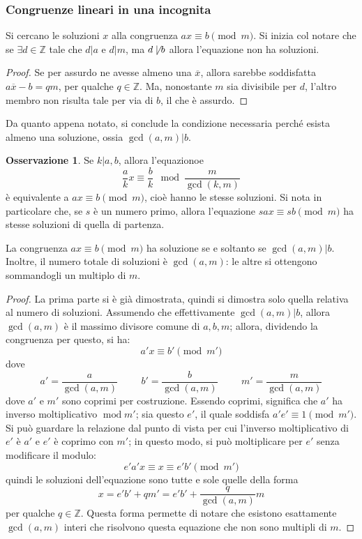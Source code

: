 \documentclass[11pt, a4paper]{scrartcl}
\theoremstyle{definition}
\numberwithin{esempio}{section}
\theoremstyle{definition}
\newtheorem{obs}{Osservazione}
\numberwithin{obs}{section}
\numberwithin{nota}{section}
\numberwithin{equation}{subsection}
\begin{document}
\subsubsection{Congruenze lineari in una incognita}
Si cercano le soluzioni $x$ alla congruenza $ax \equiv b \pmod{m} $. 
Si inizia col notare che se $\exists d \in \mathbb{Z}$ tale che $d | a$ e $d | m$, ma $d \not  \mid  b$ allora l'equazione non ha soluzioni.
\begin{proof}
	Se per assurdo ne avesse almeno una $\overline{x}$, allora sarebbe soddisfatta $a \overline{x} - b = q m $, per qualche $q \in \mathbb{Z}$. 
	Ma, nonostante $m$ sia divisibile per $d$, l'altro membro non risulta tale per via di $b$, il che \`e assurdo. 
\end{proof}
Da quanto appena notato, si conclude la condizione necessaria perch\'e esista almeno una soluzione, ossia $\operatorname{gcd}(a,m) | b$.
\begin{obs}
	Se $k | a,b$, allora l'equazionoe 
	\[
	\frac{a}{k} x \equiv \frac{b}{k} \mod \frac{m}{\operatorname{gcd}(k,m) }
	\] 
	\`e equivalente a $a x \equiv b \pmod{m} $, cio\`e hanno le stesse soluzioni. 
	Si nota in particolare che, se $s$ \`e un numero primo, allora l'equazione $sax \equiv sb \pmod{m} $ ha stesse soluzioni di quella di partenza.
\end{obs}
\begin{teorema}
	{}{}
	La congruenza $ax \equiv b \pmod{m} $ ha soluzione se e soltanto se $\operatorname{gcd}(a,m) | b$. 
	Inoltre, il numero totale di soluzioni \`e $\operatorname{gcd}(a,m) $: le altre si ottengono sommandogli un multiplo di $m$.
	\begin{proof}
		La prima parte si \`e gi\`a dimostrata, quindi si dimostra solo quella relativa al numero di soluzioni.
		Assumendo che effettivamente $\operatorname{gcd}(a,m) | b$, allora $\operatorname{gcd}(a,m) $ \`e il massimo divisore comune di $a,b,m$; allora, dividendo la congruenza per questo, si ha:
		\[
		a' x \equiv b ' \pmod{m'} 
		\] 
		dove 
		\[
		a' = \frac{a}{\operatorname{gcd}(a,m) }\hspace{1cm} b' = \frac{b}{\operatorname{gcd}(a,m) } \hspace{1cm} m' = \frac{m}{\operatorname{gcd}(a,m) }
		\] 
		dove $a'$ e $m'$ sono coprimi per costruzione. 
		Essendo coprimi, significa che $a'$ ha inverso moltiplicativo $\operatorname{mod}m' $; sia questo $e'$, il quale soddisfa $a' e '\equiv 1 \pmod{m'} $. 
		Si pu\`o guardare la relazione dal punto di vista per cui l'inverso moltiplicativo di $e'$ \`e $a'$ e $e' $ \`e coprimo con $m'$; in questo modo, si pu\`o moltiplicare per $e'$ senza modificare il modulo:
		\[
		e'a' x\equiv x \equiv e'b' \pmod{m'} 
		\] 
		quindi le soluzioni dell'equazione sono tutte e sole quelle della forma 
		\[
		x= e'b'+ qm' = e'b'+  \frac{q}{\operatorname{gcd}(a,m) } m
		\] 
		per qualche $q \in \mathbb{Z}$. 
		Questa forma permette di notare che esistono esattamente $\operatorname{gcd}(a,m) $ interi che risolvono questa equazione che non sono multipli di $m$.
	\end{proof}
\end{teorema}
\end{document}
